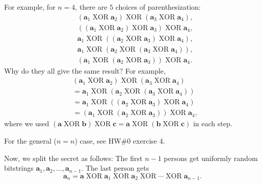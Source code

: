\documentclass[numbers=enddot,12pt,final,onecolumn,notitlepage]{scrartcl}%
\newcounter{exer}
\numberwithin{exer}{section}
\theoremstyle{definition}
\begin{document}
\begin{itemize}
For example, for $n=4$, there are $5$ choices of parenthesization:%
\begin{align*}
& \left(  \mathbf{a}_{1}\operatorname*{XOR}\mathbf{a}_{2}\right)
\operatorname*{XOR}\left(  \mathbf{a}_{3}\operatorname*{XOR}\mathbf{a}%
_{4}\right)  ,\\
& \left(  \left(  \mathbf{a}_{1}\operatorname*{XOR}\mathbf{a}_{2}\right)
\operatorname*{XOR}\mathbf{a}_{3}\right)  \operatorname*{XOR}\mathbf{a}%
_{4},\\
& \mathbf{a}_{1}\operatorname*{XOR}\left(  \left(  \mathbf{a}_{2}%
\operatorname*{XOR}\mathbf{a}_{3}\right)  \operatorname*{XOR}\mathbf{a}%
_{4}\right)  ,\\
& \mathbf{a}_{1}\operatorname*{XOR}\left(  \mathbf{a}_{2}\operatorname*{XOR}%
\left(  \mathbf{a}_{3}\operatorname*{XOR}\mathbf{a}_{4}\right)  \right)  ,\\
& \left(  \mathbf{a}_{1}\operatorname*{XOR}\left(  \mathbf{a}_{2}%
\operatorname*{XOR}\mathbf{a}_{3}\right)  \right)  \operatorname*{XOR}%
\mathbf{a}_{4}.
\end{align*}
Why do they all give the same result? For example,%
\begin{align*}
& \left(  \mathbf{a}_{1}\operatorname*{XOR}\mathbf{a}_{2}\right)
\operatorname*{XOR}\left(  \mathbf{a}_{3}\operatorname*{XOR}\mathbf{a}%
_{4}\right)  \\
& =\mathbf{a}_{1}\operatorname*{XOR}\left(  \mathbf{a}_{2}\operatorname*{XOR}%
\left(  \mathbf{a}_{3}\operatorname*{XOR}\mathbf{a}_{4}\right)  \right)  \\
& =\mathbf{a}_{1}\operatorname*{XOR}\left(  \left(  \mathbf{a}_{2}%
\operatorname*{XOR}\mathbf{a}_{3}\right)  \operatorname*{XOR}\mathbf{a}%
_{4}\right)  \\
& =\left(  \mathbf{a}_{1}\operatorname*{XOR}\left(  \mathbf{a}_{2}%
\operatorname*{XOR}\mathbf{a}_{3}\right)  \right)  \operatorname*{XOR}%
\mathbf{a}_{4},
\end{align*}
where we used $\left(  \mathbf{a}\operatorname*{XOR}\mathbf{b}\right)
\operatorname*{XOR}\mathbf{c}=\mathbf{a}\operatorname*{XOR}\left(
\mathbf{b}\operatorname*{XOR}\mathbf{c}\right)  $ in each step.

For the general ($n=n$) case, see HW\#0 exercise 4.
\end{itemize}

Now, we split the secret as follows: The first $n-1$ persons get uniformly
random bitstrings $\mathbf{a}_{1},\mathbf{a}_{2},\ldots,\mathbf{a}_{n-1}$. The
last person gets%
\[
\mathbf{a}_{n}=\mathbf{a}\operatorname*{XOR}\mathbf{a}_{1}\operatorname*{XOR}%
\mathbf{a}_{2}\operatorname*{XOR}\cdots\operatorname*{XOR}\mathbf{a}_{n-1}.
\]
\end{document}
